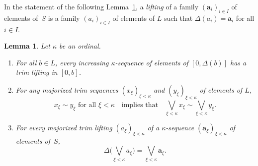 \documentclass[psamsfonts,reqno]{memo-l}
\theoremstyle{plain}
\newtheorem{lemma}{Lemma}[section]
\theoremstyle{definition}
\theoremstyle{remark}
\numberwithin{equation}{section}
\newcommand{\la}{\boldsymbol{a}}
\newcommand{\DD}{\Delta}
\newcommand{\famm}[2]{(#1)_{#2}}
\begin{document}
In the statement of the following Lemma~\ref{L:TrimSeq}, a \emph{lifting} of
a family $\famm{\la_i}{i\in I}$ of elements of~$S$ is a family
$\famm{a_i}{i\in I}$ of elements of $L$ such that $\DD(a_i)=\la_i$ for all
$i\in I$.

\begin{lemma}\label{L:TrimSeq}
Let $\kappa$ be an ordinal.
\begin{enumerate}
\item For all $b\in L$, every increasing $\kappa$-sequence of elements of
$[0,\DD(b)]$ has a trim lifting in $[0,b]$.

\item For any majorized trim sequences $\famm{x_\xi}{\xi<\kappa}$ and
$\famm{y_\xi}{\xi<\kappa}$ of elements of $L$,
   \[
   x_\xi\sim y_\xi\text{ for all }\xi<\kappa\quad\text{implies that}\quad
   \bigvee_{\xi<\kappa}x_\xi\sim\bigvee_{\xi<\kappa}y_\xi.
   \]

\item For every majorized trim lifting $\famm{a_\xi}{\xi<\kappa}$ of
a $\kappa$-sequence $\famm{\la_\xi}{\xi<\kappa}$ of elements of~$S$,
   \[
   \DD\biggl(\bigvee_{\xi<\kappa}a_\xi\biggr)=\bigvee_{\xi<\kappa}\la_\xi.
   \]
\end{enumerate}

\end{lemma}
\end{document}
